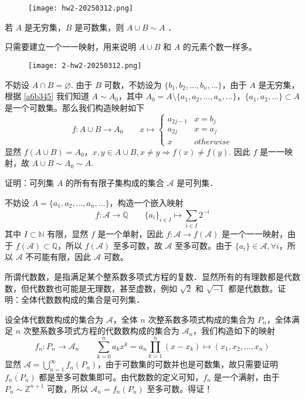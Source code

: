 \begin{figure}[H]
\centering
\texttt{[image: hw2-20250312.png]}
\label{}
\end{figure}

\begin{exercise}
若 $A$ 是无穷集，$B$ 是可数集，则 $A \cup B \sim A$ ．
\end{exercise}
只需要建立一个一一映射，用来说明 $A\cup B$ 和 $A$ 的元素个数一样多。

\begin{theorem}
\begin{figure}[H]
\centering
\texttt{[image: 2-hw2-20250312.png]}
\label{}
\end{figure}\label{a6b345}
\end{theorem}

不妨设 $A\cap B=\varnothing$. 由于 $B$ 可数，不妨设为 $\{ b_1,b_2,\dots,b_n,\dots \}$，由于 $A$ 是无穷集，根据 \cref{a6b345} 我们知道 $A\sim A_0$，其中 $A_0=A\setminus \{ a_1,a_2,\dots,a_n,\dots \}$，$\{ a_1,a_2,\dots \}\subset A$ 是一个可数集。那么我们构造映射如下
\[
f:A\cup B\to A_0\qquad x\mapsto\begin{cases}
a_{2j-1} & x=b_j \\
a_{2j} & x=a_j \\
x & otherwise
\end{cases}
\]
显然 $f(A\cup B)=A_0$，$x, y\in A\cup B,x\neq y\Rightarrow f(x)\neq f(y)$. 因此 $f$ 是一一映射，故 $A\cup B\sim A_0\sim A$.

\begin{exercise}
证明：可列集 $A$ 的所有有限子集构成的集合 $\mathscr{A}$ 是可列集．
\end{exercise}
不妨设 $A=\{ a_1,a_2,\dots,a_n,\dots \}$，构造一个嵌入映射
\[
f:\mathscr{A}\to \mathbb{Q}\qquad \{ a_i \}_{i\in I}\mapsto \sum_{i\in I}^{} 2^{-i}
\]
其中 $I\subset \mathbb{N}$ 有限，显然 $f$ 是一个单射，因此 $f:\mathscr{A\to}f(\mathscr{A})$ 是一个一一映射，由于 $f(\mathscr{A})\subset \mathbb{Q}$，所以 $f(\mathscr{A})$ 至多可数，故 $\mathscr{A}$ 至多可数。由于 $\{ a_i \}\in \mathscr{A},\forall i$，所以 $\mathscr{A}$ 不可能有限，因此 $\mathscr{A}$ 可数。

\begin{exercise}
所谓代数数，是指满足某个整系数多项式方程的复数．显然所有的有理数都是代数数，但代数数也可能是无理数，甚至虚数，例如 $\sqrt{2}$ 和 $\sqrt{-1}$ 都是代数数。证明：全体代数数构成的集合是可列集．
\end{exercise}
设全体代数数构成的集合为 $\mathscr{A}$，全体 $n$ 次整系数多项式构成的集合为 $P_n$，全体满足 $n$ 次整系数多项式方程的代数数构成的集合为 $\mathscr{A}_n$，我们构造如下的映射
\[
f_n:P_n\to \mathscr{A}_n\qquad \sum_{k=0}^{n} a_kx^{k}=a_n\prod_{k=1}^{n} (x-x_k)\mapsto(x_1,x_2,\dots ,x_n)
\]
显然 $\mathscr{A}=\bigcup_{n=1}^{\infty}f_n(P_n)$，由于可数集的可数并也是可数集，故只需要证明 $f_n(P_n)$ 都是至多可数集即可。由代数数的定义可知，$f_n$ 是一个满射，由于 $P_n\sim \mathbb{Z}^{n+1}$ 可数，所以 $\mathscr{A}_n=f_n(P_n)$ 至多可数。得证！


